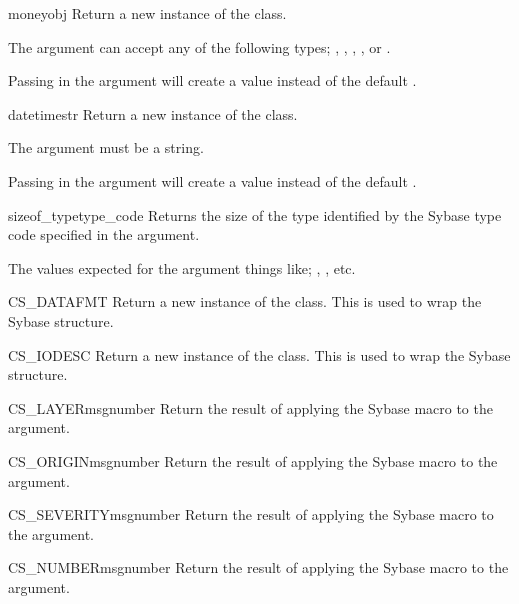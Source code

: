 \begin{funcdesc}{money}{obj }
Return a new instance of the  class.

The  argument can accept any of the following types;
, , , ,
or .

Passing  in the  argument will create a
 value instead of the default .
\end{funcdesc}

\begin{funcdesc}{datetime}{str }
Return a new instance of the  class.

The  argument must be a string.

Passing  in the  argument will
create a  value instead of the default
.
\end{funcdesc}

\begin{funcdesc}{sizeof_type}{type_code}
Returns the size of the type identified by the Sybase type code
specified in the  argument.

The values expected for the  argument things like;
, , etc.
\end{funcdesc}

\begin{funcdesc}{CS_DATAFMT}{}
Return a new instance of the  class.  This is used
to wrap the Sybase  structure.
\end{funcdesc}

\begin{funcdesc}{CS_IODESC}{}
Return a new instance of the  class.  This is used
to wrap the Sybase  structure.
\end{funcdesc}

\begin{funcdesc}{CS_LAYER}{msgnumber}
Return the result of applying the Sybase  macro to the
 argument.
\end{funcdesc}

\begin{funcdesc}{CS_ORIGIN}{msgnumber}
Return the result of applying the Sybase  macro to the
 argument.
\end{funcdesc}

\begin{funcdesc}{CS_SEVERITY}{msgnumber}
Return the result of applying the Sybase  macro to the
 argument.
\end{funcdesc}

\begin{funcdesc}{CS_NUMBER}{msgnumber}
Return the result of applying the Sybase  macro to the
 argument.
\end{funcdesc}









